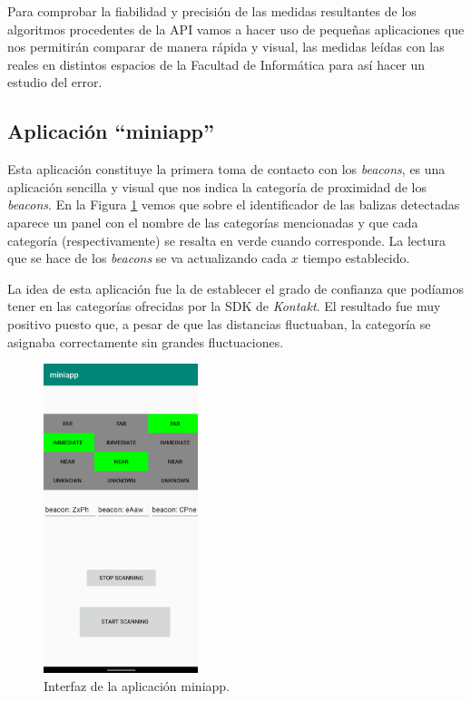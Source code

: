 Para comprobar la fiabilidad y precisión de las medidas resultantes de los algoritmos procedentes de la API vamos a hacer uso de pequeñas aplicaciones que nos permitirán comparar de manera rápida y visual, las medidas leídas con las reales en distintos espacios de la Facultad de Informática para así hacer un estudio del error.

\subsection{Aplicación ``miniapp''}
Esta aplicación constituye la primera toma de contacto con los \textit{beacons}, es una aplicación sencilla y visual que nos indica la categoría de proximidad de los \textit{beacons}. En la Figura \ref{fig:miniapp} vemos que sobre el identificador de las balizas detectadas aparece un panel con el nombre de las categorías mencionadas y que cada categoría (respectivamente) se resalta en verde cuando corresponde. La lectura que se hace de los \textit{beacons} se va actualizando cada $x$ tiempo establecido. 

La idea de esta aplicación fue la de establecer el grado de confianza que podíamos tener en las categorías ofrecidas por la SDK de \textit{Kontakt}. El resultado fue muy positivo puesto que, a pesar de que las distancias fluctuaban, la categoría se asignaba correctamente sin grandes fluctuaciones. 

\begin{figure}[t]
	\centering
	\includegraphics[width=0.4\textwidth]{Imagenes/Descripciondeltrabajo/miniapp}
	\caption{Interfaz de la aplicación miniapp. }
	\label{fig:miniapp}
\end{figure}

